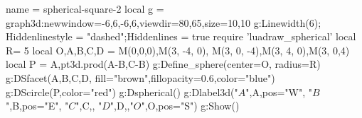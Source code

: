 \documentclass{standalone}
\begin{document}
\begin{luadraw}{name = spherical-square-2}
  local g = graph3d:new{window={-6,6,-6,6},viewdir={80,65},size={10,10}}
  g:Linewidth(6); Hiddenlinestyle = "dashed";Hiddenlines = true
 require 'luadraw_spherical'
 local R= 5
 local O,A,B,C,D = M(0,0,0),M(3, -4, 0), M(3, 0, -4),M(3, 4, 0),M(3, 0,4)
 local P = {A,pt3d.prod(A-B,C-B)}
 g:Define_sphere({center=O, radius=R})
 g:DSfacet({A,B,C,D}, {fill="brown",fillopacity=0.6,color="blue"})
 g:DScircle(P,{color="red"})
 g:Dspherical()
 g:Dlabel3d("$A$",A,{pos="W"}, "$B$",B,{pos="E"}, "$C$",C,{}, "$D$",D,{},"$O$",O,{pos="S"})
 g:Show()
\end{luadraw}
\end{document}
